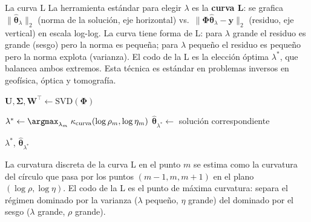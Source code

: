 \begin{observacion}{La curva L}
La herramienta estándar para elegir $\lambda$ es la \textbf{curva L}:
se grafica $\|\hat{\bm{\theta}}_\lambda\|_2$ (norma de la solución,
eje horizontal) vs.\ $\|\bm{\Phi}\hat{\bm{\theta}}_\lambda -
\bm{y}\|_2$ (residuo, eje vertical) en escala log-log. La curva tiene
forma de L: para $\lambda$ grande el residuo es grande (sesgo) pero la
norma es pequeña; para $\lambda$ pequeño el residuo es pequeño pero la
norma explota (varianza). El codo de la L es la elección óptima
$\lambda^*$, que balancea ambos extremos. Esta técnica es estándar en
problemas inversos en geofísica, óptica y tomografía.
\end{observacion}

\begin{algorithm}[H]
\caption{Ajuste regularizado de Tikhonov con selección de $\lambda$
         por curva L}
\label{alg:tikhonov}
 
$\bm{U}, \bm{\Sigma}, \bm{W}^\top \leftarrow \mathrm{SVD}(\bm{\Phi})$\;
 
 
$\lambda^* \leftarrow \argmax_{\lambda_m}\;
\kappa_{\text{curva}}(\log\rho_m, \log\eta_m)$
$\hat{\bm{\theta}}_{\lambda^*} \leftarrow$ solución correspondiente\;
 
\Return $\lambda^*$, $\hat{\bm{\theta}}_{\lambda^*}$\;
\end{algorithm}
 
La curvatura discreta de la curva L en el punto $m$ se estima como la
curvatura del círculo que pasa por los puntos $(m{-}1, m, m{+}1)$ en el
plano $(\log\rho, \log\eta)$. El codo de la L es el punto de máxima
curvatura: separa el régimen dominado por la varianza ($\lambda$ pequeño,
$\eta$ grande) del dominado por el sesgo ($\lambda$ grande, $\rho$ grande).


